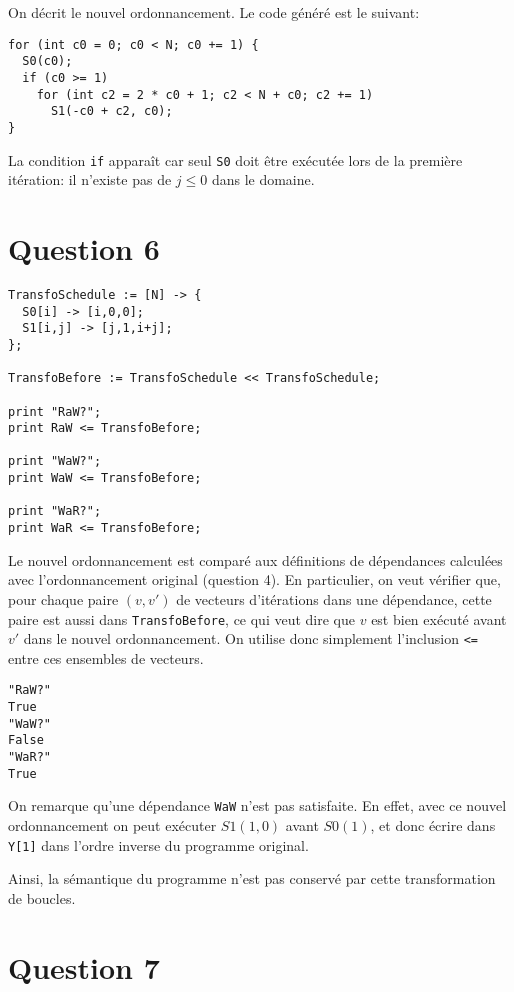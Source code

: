 \documentclass{article}
\begin{document}
On décrit le nouvel ordonnancement. Le code généré est le suivant:

\begin{lstlisting}
for (int c0 = 0; c0 < N; c0 += 1) {
  S0(c0);
  if (c0 >= 1)
    for (int c2 = 2 * c0 + 1; c2 < N + c0; c2 += 1)
      S1(-c0 + c2, c0);
}
\end{lstlisting}

La condition \lstinline{if} apparaît car seul \lstinline{S0} doit être exécutée lors de la première itération: il n'existe pas de $j\leq 0$ dans le domaine.

\section*{Question 6}
\begin{lstlisting}
TransfoSchedule := [N] -> {
  S0[i] -> [i,0,0];
  S1[i,j] -> [j,1,i+j];
};

TransfoBefore := TransfoSchedule << TransfoSchedule;

print "RaW?";
print RaW <= TransfoBefore;

print "WaW?";
print WaW <= TransfoBefore;

print "WaR?";
print WaR <= TransfoBefore;
\end{lstlisting}

Le nouvel ordonnancement est comparé aux définitions de dépendances calculées avec l'ordonnancement original (question 4).
En particulier, on veut vérifier que, pour chaque paire $(v,v')$ de vecteurs d'itérations dans une dépendance, cette paire est aussi dans \lstinline{TransfoBefore}, ce qui veut dire que $v$ est bien exécuté avant $v'$ dans le nouvel ordonnancement. On utilise donc simplement l'inclusion \lstinline{<=} entre ces ensembles de vecteurs.

\begin{lstlisting}
"RaW?"
True
"WaW?"
False
"WaR?"
True
\end{lstlisting}

On remarque qu'une dépendance \lstinline{WaW} n'est pas satisfaite.
En effet, avec ce nouvel ordonnancement on peut exécuter $S1(1,0)$ avant $S0(1)$, et donc écrire dans \lstinline{Y[1]} dans l'ordre inverse du programme original.

Ainsi, la sémantique du programme n'est pas conservé par cette transformation de boucles.

\section*{Question 7}
\end{document}
